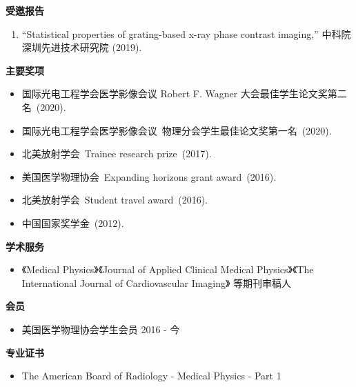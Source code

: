 \documentclass[letterpaper,11pt]{article}
\newcommand{\resheading}[1]{{\large \colorbox{mygrey}{\begin{minipage}{\textwidth}{\textbf{#1 \vphantom{p\^{E}}}}\end{minipage}}}}
\begin{document}
\begin{CJK}{UTF8}{song}
\resheading {受邀报告}
\begin{enumerate}\justifying
\item ``Statistical properties of grating-based x-ray phase contrast imaging,'' 中科院深圳先进技术研究院 (2019).
\end{enumerate}
\resheading{主要奖项}
\begin{itemize}\justifying
\item 国际光电工程学会医学影像会议 Robert F. Wagner 大会最佳学生论文奖第二名~(2020).
\item 国际光电工程学会医学影像会议~物理分会学生最佳论文奖第一名~(2020).
\item 北美放射学会~Trainee research prize~(2017).
\item 美国医学物理协会~Expanding horizons grant award~(2016).
\item 北美放射学会~Student travel award~(2016).
\item 中国国家奖学金~(2012).
\end{itemize}
\resheading{学术服务}
\begin{itemize}
\item 《Medical Physics》《Journal of Applied Clinical Medical Physics》《The International Journal of Cardiovascular Imaging》 等期刊审稿人
\end{itemize}
\resheading{会员}
\begin{itemize}
\item 美国医学物理协会学生会员 \cftdotfill{\cftdotsep} 2016 - 今
\end{itemize}
\resheading{专业证书}
\begin{itemize}
\item The American Board of Radiology - Medical Physics - Part 1
\end{itemize}
\end{CJK}
\end{document}
